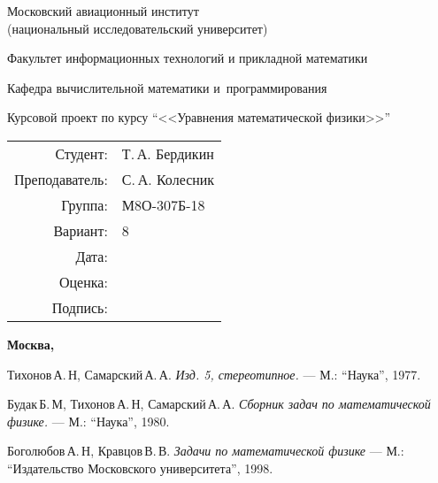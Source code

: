 \documentclass[a4paper]{article}
\begin{document}
\begin{titlepage}
\begin{center}
\bfseries

{\Large Московский авиационный институт\\ (национальный исследовательский университет)

}

\vspace{48pt}

{\large Факультет информационных технологий и прикладной математики
}

\vspace{36pt}


{\large Кафедра вычислительной математики и~программирования

}


\vspace{48pt}

Курсовой проект по курсу \enquote{<<Уравнения математической физики>>}

\end{center}

\vspace{72pt}

\begin{flushright}
\begin{tabular}{rl}
Студент: & Т.\,А. Бердикин \\
Преподаватель: & С.\,А. Колесник \\
Группа: & М8О-307Б-18 \\
Вариант: & 8 \\
Дата: & \\
Оценка: & \\
Подпись: & \\
\end{tabular}
\end{flushright}

\vfill

\begin{center}
\bfseries
Москва, \the\year
\end{center}
\end{titlepage}
 

\newpage
\begin{thebibliography}{99}
Тихонов\,А.\,Н, Самарский\,А.\,А.
{\itshape Изд. 5, стереотипное.} --- М.: \enquote{Наука}, 1977.

Будак\,Б.\,М, Тихонов\,А.\,Н, Самарский\,А.\,А.
{\itshape Сборник задач по математической физике.} --- М.: \enquote{Наука}, 1980.

Боголюбов\,А.\,Н, Кравцов\,В.\,В.
{\itshape Задачи по математической физике} --- М.: \enquote{Издательство Московского университета}, 1998.


\end{thebibliography}
\pagebreak
\end{document}
